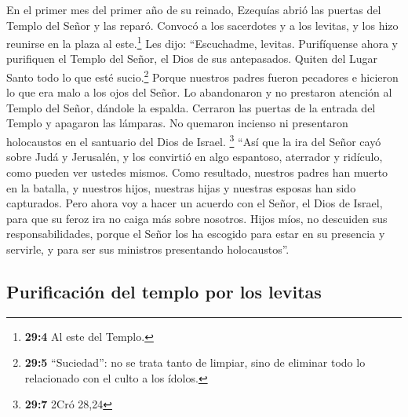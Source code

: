  En el primer mes del primer año de su reinado, Ezequías
abrió las puertas del Templo del Señor y las reparó. 
Convocó a los sacerdotes y a los levitas, y los hizo reunirse en la
plaza al este.\footnote{\textbf{29:4} Al este del Templo.}
 Les dijo: ``Escuchadme, levitas. Purifíquense ahora y
purifiquen el Templo del Señor, el Dios de sus antepasados. Quiten del
Lugar Santo todo lo que esté sucio.\footnote{\textbf{29:5} ``Suciedad'':
  no se trata tanto de limpiar, sino de eliminar todo lo relacionado con
  el culto a los ídolos.}  Porque nuestros padres fueron
pecadores e hicieron lo que era malo a los ojos del Señor. Lo
abandonaron y no prestaron atención al Templo del Señor, dándole la
espalda.  Cerraron las puertas de la entrada del Templo y
apagaron las lámparas. No quemaron incienso ni presentaron holocaustos
en el santuario del Dios de Israel. \footnote{\textbf{29:7} 2Cró 28,24}
 ``Así que la ira del Señor cayó sobre Judá y Jerusalén, y
los convirtió en algo espantoso, aterrador y ridículo, como pueden ver
ustedes mismos.  Como resultado, nuestros padres han
muerto en la batalla, y nuestros hijos, nuestras hijas y nuestras
esposas han sido capturados.  Pero ahora voy a hacer un
acuerdo con el Señor, el Dios de Israel, para que su feroz ira no caiga
más sobre nosotros.  Hijos míos, no descuiden sus
responsabilidades, porque el Señor los ha escogido para estar en su
presencia y servirle, y para ser sus ministros presentando
holocaustos''.

\hypertarget{purificaciuxf3n-del-templo-por-los-levitas}{%
\subsection{Purificación del templo por los
levitas}\label{purificaciuxf3n-del-templo-por-los-levitas}}

